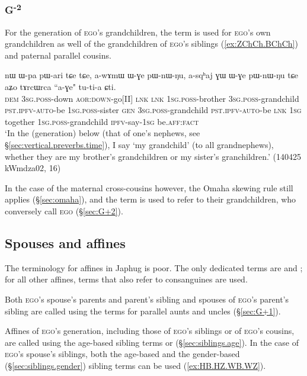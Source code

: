 \subsubsection{G\textsuperscript{-2}} \label{sec:G-2}
For the generation of \textsc{ego}'s grandchildren, the term  is used for \textsc{ego}'s own grandchildren as well of the grandchildren of \textsc{ego}'s siblings (\ref{ex:ZChCh.BChCh}) and paternal parallel cousins.

\begin{exe}
\ex \label{ex:ZChCh.BChCh}
\gll nɯ ɯ-pa pɯ-ari tɕe tɕe, a-wɤmɯ ɯ-ɣe pɯ-nɯ-ŋu, a-sqʰaj ɣɯ ɯ-ɣe pɯ-nɯ-ŋu tɕe aʑo tɤrcɯrca ``a-ɣe" tu-ti-a ɕti. \\
\textsc{dem} \textsc{3sg}.\textsc{poss}-down \textsc{aor}:\textsc{down}-go[II] \textsc{lnk} \textsc{lnk} \textsc{1sg}.\textsc{poss}-brother \textsc{3sg}.\textsc{poss}-grandchild \textsc{pst}.\textsc{ipfv}-\textsc{auto}-be \textsc{1sg}.\textsc{poss}-sister \textsc{gen} \textsc{3sg}.\textsc{poss}-grandchild \textsc{pst}.\textsc{ipfv}-\textsc{auto}-be \textsc{lnk} \textsc{1sg} together \textsc{1sg}.\textsc{poss}-grandchild \textsc{ipfv}-say-\textsc{1sg} be.\textsc{aff}:\textsc{fact} \\
\glt `In the (generation) below (that of one's nephews, see §\ref{sec:vertical.preverbs.time}), I say  `my grandchild' (to all grandnephews), whether they are my brother's grandchildren or my sister's granchildren.' (140425 kWmdza02, 16)
\end{exe}

In the case of the maternal cross-cousins however, the Omaha skewing rule still applies (§\ref{sec:omaha}), and the term  is used to refer to their grandchildren, who conversely call \textsc{ego}  (§\ref{sec:G+2}).


\subsection{Spouses and affines} \label{sec:spouses}
The terminology for affines in Japhug is poor. The only dedicated terms are  and ; for all other affines, terms that also refer to consanguines are used.

Both \textsc{ego}'s spouse's parents and parent's sibling and spouses of \textsc{ego}'s parent's sibling are called using the terms for parallel aunts and uncles (§\ref{sec:G+1}).

Affines of \textsc{ego}'s generation, including those of \textsc{ego}'s siblings or of \textsc{ego}'s cousins, are called using the age-based sibling terms  or  (§\ref{sec:siblings.age}). In the case of \textsc{ego}'s spouse's siblings, both the age-based and the gender-based (§\ref{sec:siblings.gender}) sibling terms can be used (\ref{ex:HB.HZ.WB.WZ}).

